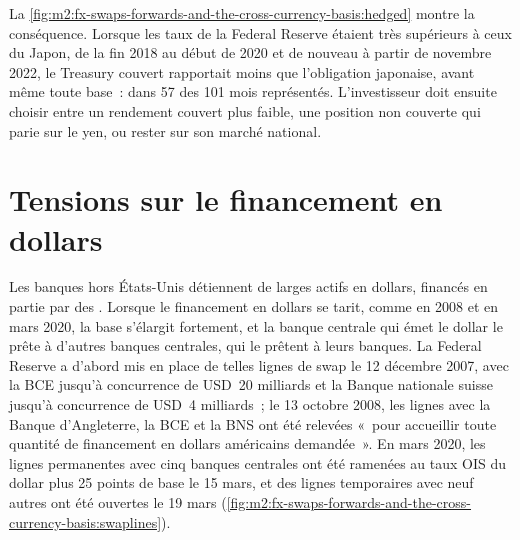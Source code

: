 La \cref{fig:m2:fx-swaps-forwards-and-the-cross-currency-basis:hedged} montre
la conséquence. Lorsque les taux de la Federal Reserve étaient très supérieurs à ceux du Japon, de la
fin 2018 au début de 2020 et de nouveau à partir de novembre 2022, le Treasury couvert rapportait moins
que l'obligation japonaise, avant même toute base~: dans 57 des 101 mois représentés. L'investisseur
doit ensuite choisir entre un rendement couvert plus faible, une position non couverte qui parie sur le
yen, ou rester sur son marché national.

\section{Tensions sur le financement en dollars}

Les banques hors États-Unis détiennent de larges actifs en dollars, financés en partie par des . Lorsque
le financement en dollars se tarit, comme en 2008 et en mars 2020, la base s'élargit fortement,
et la banque centrale qui émet le dollar le prête à d'autres banques centrales,
qui le prêtent à leurs banques. La Federal Reserve a d'abord mis en place de telles lignes de swap
le 12 décembre 2007, avec la BCE jusqu'à concurrence de USD~20 milliards et la Banque
nationale suisse jusqu'à concurrence de USD~4 milliards~; le 13 octobre 2008, les lignes avec la Banque
d'Angleterre, la BCE et la BNS ont été relevées «~pour accueillir toute quantité de
financement en dollars américains demandée~». En mars 2020, les lignes permanentes avec cinq
banques centrales ont été ramenées au taux OIS du dollar plus 25 points de base le 15
mars, et des lignes temporaires avec neuf autres ont été ouvertes le 19 mars
(\cref{fig:m2:fx-swaps-forwards-and-the-cross-currency-basis:swaplines}).

\begin{omfigure}

\label{fig:m2:fx-swaps-forwards-and-the-cross-currency-basis:swaplines}
\end{omfigure}

